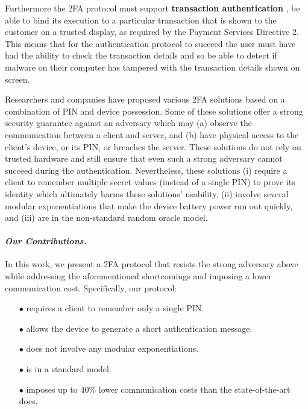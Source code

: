 Furthermore the 2FA protocol must support \textbf{transaction authentication} \ie, be able to bind its execution to a particular transaction that is shown to the customer on a trusted display, as required by the Payment Services Directive 2.
This means that for the authentication protocol to succeed the user must have had the ability to check the transaction details and so be able to detect if malware on their computer has tampered with the transaction details shown on screen.

Researchers and companies have proposed various 2FA solutions based on a combination of PIN and device possession. Some of these solutions offer a strong security guarantee against an adversary which may (a) observe the communication between a client and server, and (b) have physical access to the client's device, or its PIN, or breaches the server. These solutions do not rely on trusted hardware and still ensure that even such a strong adversary cannot succeed during the authentication. Nevertheless, these solutions (i) require a client to remember multiple secret values (instead of a single PIN)  to prove its identity which ultimately harms these solutions' usability, (ii) involve several modular exponentiations that make the device battery power run out quickly, and (iii) are in the non-standard random oracle model.

\paragraph{\textbf{\textit{Our Contributions.}}}  In this work, we present a 2FA protocol that resists the strong adversary above while addressing the aforementioned shortcomings and imposing a lower communication cost. Specifically, our protocol:

\begin{itemize}
\item[$\bullet$] requires a client to remember only a single PIN.

\item[$\bullet$] {allows the device to generate a short authentication message.} 

\item[$\bullet$] does not involve any modular exponentiations.

\item[$\bullet$] is in a standard model.

\item[$\bullet$]  imposes up to $40\%$ lower communication costs than the state-of-the-art does. 


\end{itemize}


